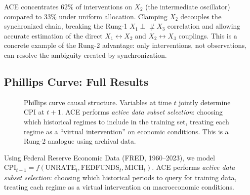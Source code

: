 ACE concentrates $62\%$ of interventions on $X_2$ (the intermediate oscillator) compared to $33\%$ under uniform allocation. Clamping $X_2$ decouples the synchronized chain, breaking the Rung-1 $X_1 \perp\!\!\!\!\not\perp X_3$ correlation and allowing accurate estimation of the direct $X_1 \leftrightarrow X_2$ and $X_2 \leftrightarrow X_3$ couplings. This is a concrete example of the Rung-2 advantage: only interventions, not observations, can resolve the ambiguity created by synchronization.

\subsection{Phillips Curve: Full Results}
\label{app:phillips}

\begin{figure}[h]
\centering
{}
\caption{Phillips curve causal structure. Variables at time $t$ jointly determine CPI at $t+1$. ACE performs \emph{active data subset selection}: choosing which historical regimes to include in the training set, treating each regime as a ``virtual intervention'' on economic conditions. This is a Rung-2 analogue using archival data.}
\label{fig:phillips-scm}
\end{figure}

Using Federal Reserve Economic Data \citep{fred2024} (FRED, 1960--2023), we model $\text{CPI}_{t+1} = f(\text{UNRATE}_t, \text{FEDFUNDS}_t, \text{MICH}_t)$. ACE performs \emph{active data subset selection}: choosing which historical periods to query for training data, treating each regime as a virtual intervention on macroeconomic conditions.

